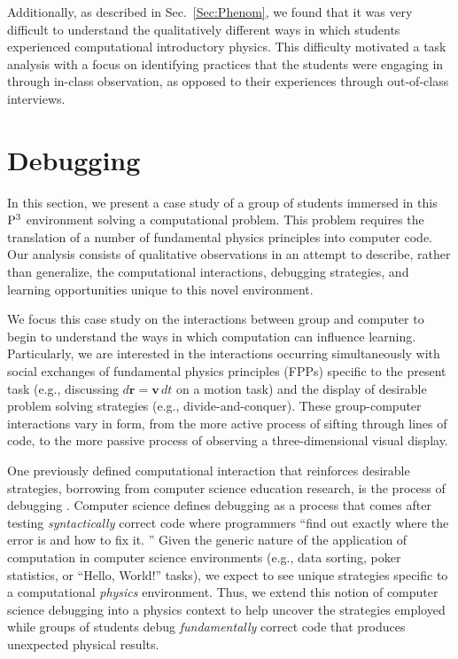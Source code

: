 \documentclass{msuphddissertation}
\begin{document}
\begin{doublespace}
Additionally, as described in Sec.~\ref{Sec:Phenom}, we found that it was very difficult to understand the qualitatively different ways in which students experienced computational introductory physics.  This difficulty motivated a task analysis with a focus on identifying practices that the students were engaging in through in-class observation, as opposed to their experiences through out-of-class interviews.
  
\section{Debugging}\label{Sec:Debug}

In this section, we present a case study of a group of students immersed in this ${\rm P}^{3}$ environment solving a computational problem.  This problem requires the translation of a number of fundamental physics principles into computer code.  Our analysis consists of qualitative observations in an attempt to describe, rather than generalize, the computational interactions, debugging strategies, and learning opportunities unique to this novel environment.

We focus this case study on the interactions between group and computer to begin to understand the ways in which computation can influence learning.  Particularly, we are interested in the interactions occurring simultaneously with social exchanges of fundamental physics principles (FPPs) specific to the present task (e.g., discussing $d\mathbf{r}=\mathbf{v}\,dt$ on a motion task) and the display of desirable problem solving strategies (e.g., divide-and-conquer).  These group-computer interactions vary in form, from the more active process of sifting through lines of code, to the more passive process of observing a three-dimensional visual display.

One previously defined computational interaction that reinforces desirable strategies, borrowing from computer science education research, is the process of debugging \cite{Fitzgerald2008}.  Computer science defines debugging as a process that comes after testing \emph{syntactically} correct code where programmers ``find out exactly where the error is and how to fix it. \cite{McCauley2008}''  Given the generic nature of the application of computation in computer science environments (e.g., data sorting, poker statistics, or ``Hello, World!'' tasks), we expect to see unique strategies specific to a computational \emph{physics} environment.  Thus, we extend this notion of computer science debugging into a physics context to help uncover the strategies employed while groups of students debug \emph{fundamentally} correct code that produces unexpected physical results.


\end{doublespace}
\end{document}
